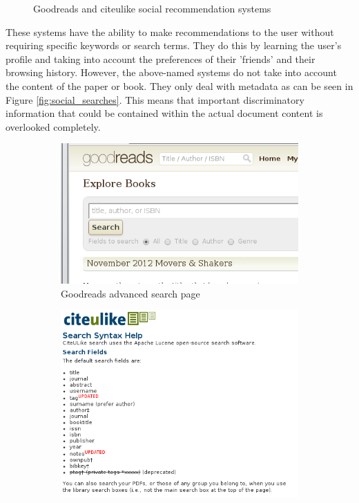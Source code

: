 \documentclass[12pt,a4paper]{article}
\begin{document}
\begin{figure}[!hbt]
        \caption{Goodreads and citeulike social recommendation systems}
        \label{fig:social_indexes}
\end{figure}

These systems have the ability to make recommendations to the user without
requiring specific keywords or search terms. They do this by learning the
user's profile and taking into account the preferences of their 'friends' and
their browsing history. However, the above-named systems do not take into
account the content of the paper or book. They only deal with metadata as can
be seen in Figure \ref{fig:social_searches}. This means that important
discriminatory information that could be contained within the actual document
content is overlooked completely. 

\begin{figure}[!hbt]
        \centering
        \begin{subfigure}[b]{0.50\textwidth}
                \centering
                \includegraphics[width=\textwidth]{images/goodreads_search.png}
                \caption{Goodreads advanced search page}
                \label{fig:goodreads_search}
        \end{subfigure}%
        \begin{subfigure}[b]{0.50\textwidth}
                \centering
                \includegraphics[width=\textwidth]{images/citeulike_search.png}

\end{subfigure}
\end{figure}
\end{document}
